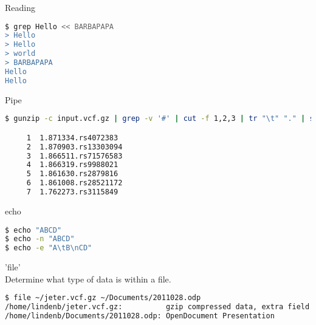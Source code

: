 \documentclass{beamer}
\begin{document}
\begin{frame}[fragile]
 \begin{center}
    \huge{Reading}\\
  \end{center}
\begin{lstlisting}[language=bash]
$ grep Hello << BARBAPAPA
> Hello
> Hello
> world
> BARBAPAPA
Hello
Hello
\end{lstlisting}
\end{frame}


\begin{frame}[fragile]
 \begin{center}
    \huge{Pipe}\\
  \end{center}
\begin{lstlisting}[language=bash]
$ gunzip -c input.vcf.gz | grep -v '#' | cut -f 1,2,3 | tr "\t" "." | sed 's/chr//' | sort -t '.'  -k2,2rn | uniq  | cat -n

     1	1.871334.rs4072383
     2	1.870903.rs13303094
     3	1.866511.rs71576583
     4	1.866319.rs9988021
     5	1.861630.rs2879816
     6	1.861008.rs28521172
     7	1.762273.rs3115849

\end{lstlisting}
\end{frame}

\begin{frame}[fragile]
 \begin{center}
    \huge{echo}\\
    \end{center}
\begin{lstlisting}[language=bash]
$ echo "ABCD"
$ echo -n "ABCD"
$ echo -e "A\tB\nCD"
\end{lstlisting}
\end{frame}

\begin{frame}[fragile]
 \begin{center}
    \huge{'file'}\\
     	Determine what type of data is within a file.\\
    \end{center}
\begin{lstlisting}[language=bash]
$ file ~/jeter.vcf.gz ~/Documents/2011028.odp
/home/lindenb/jeter.vcf.gz:          gzip compressed data, extra field
/home/lindenb/Documents/2011028.odp: OpenDocument Presentation
\end{lstlisting}
\end{frame}
\end{document}
